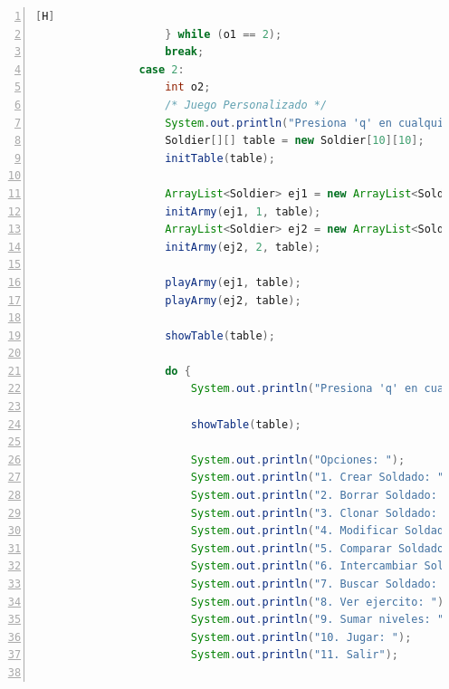 \documentclass{article}
\begin{document}
\begin{lstlisting}[language=java,caption={Método main Final}, numbers=left][H]
                    } while (o1 == 2);
                    break;
                case 2:
                    int o2;
                    /* Juego Personalizado */
                    System.out.println("Presiona 'q' en cualquier momento para salir");
                    Soldier[][] table = new Soldier[10][10];
                    initTable(table);

                    ArrayList<Soldier> ej1 = new ArrayList<Soldier>();
                    initArmy(ej1, 1, table);
                    ArrayList<Soldier> ej2 = new ArrayList<Soldier>();
                    initArmy(ej2, 2, table);

                    playArmy(ej1, table);
                    playArmy(ej2, table);

                    showTable(table);

                    do {
                        System.out.println("Presiona 'q' en cualquier momento para salir");

                        showTable(table);

                        System.out.println("Opciones: ");
                        System.out.println("1. Crear Soldado: ");
                        System.out.println("2. Borrar Soldado: ");
                        System.out.println("3. Clonar Soldado: ");
                        System.out.println("4. Modificar Soldado: ");
                        System.out.println("5. Comparar Soldados: ");
                        System.out.println("6. Intercambiar Soldados: ");
                        System.out.println("7. Buscar Soldado: ");
                        System.out.println("8. Ver ejercito: ");
                        System.out.println("9. Sumar niveles: ");
                        System.out.println("10. Jugar: ");
                        System.out.println("11. Salir");


\end{lstlisting}
\end{document}
